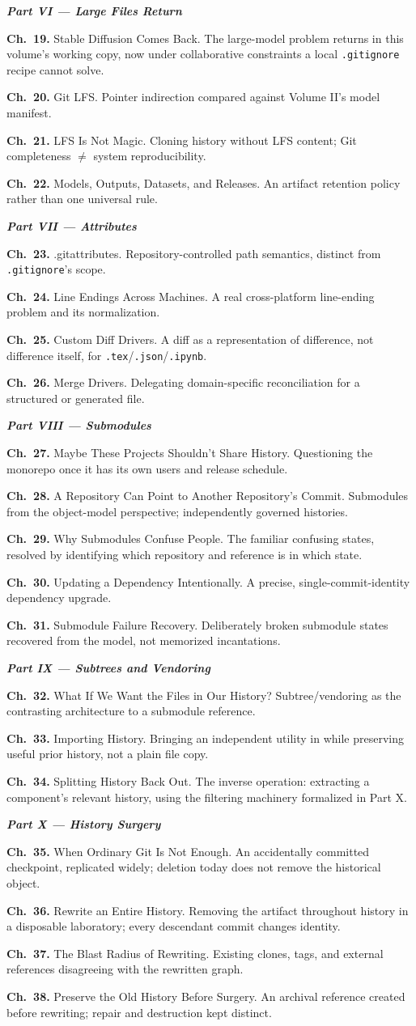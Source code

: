 \documentclass[11pt]{book}
\newcommand{\chapentry}[2]{\noindent\textbf{Ch.~#1.} #2\par\smallskip}
\newcommand{\partheading}[1]{\bigskip\noindent\textbf{\textit{#1}}\smallskip\par}
\begin{document}
\partheading{Part VI --- Large Files Return}
\chapentry{19}{Stable Diffusion Comes Back. The large-model problem returns in this volume's working copy, now under collaborative constraints a local \texttt{.gitignore} recipe cannot solve.}
\chapentry{20}{Git LFS. Pointer indirection compared against Volume II's model manifest.}
\chapentry{21}{LFS Is Not Magic. Cloning history without LFS content; Git completeness $\neq$ system reproducibility.}
\chapentry{22}{Models, Outputs, Datasets, and Releases. An artifact retention policy rather than one universal rule.}

\partheading{Part VII --- Attributes}
\chapentry{23}{.gitattributes. Repository-controlled path semantics, distinct from \texttt{.gitignore}'s scope.}
\chapentry{24}{Line Endings Across Machines. A real cross-platform line-ending problem and its normalization.}
\chapentry{25}{Custom Diff Drivers. A diff as a representation of difference, not difference itself, for \texttt{.tex}/\texttt{.json}/\texttt{.ipynb}.}
\chapentry{26}{Merge Drivers. Delegating domain-specific reconciliation for a structured or generated file.}

\partheading{Part VIII --- Submodules}
\chapentry{27}{Maybe These Projects Shouldn't Share History. Questioning the monorepo once it has its own users and release schedule.}
\chapentry{28}{A Repository Can Point to Another Repository's Commit. Submodules from the object-model perspective; independently governed histories.}
\chapentry{29}{Why Submodules Confuse People. The familiar confusing states, resolved by identifying which repository and reference is in which state.}
\chapentry{30}{Updating a Dependency Intentionally. A precise, single-commit-identity dependency upgrade.}
\chapentry{31}{Submodule Failure Recovery. Deliberately broken submodule states recovered from the model, not memorized incantations.}

\partheading{Part IX --- Subtrees and Vendoring}
\chapentry{32}{What If We Want the Files in Our History? Subtree/vendoring as the contrasting architecture to a submodule reference.}
\chapentry{33}{Importing History. Bringing an independent utility in while preserving useful prior history, not a plain file copy.}
\chapentry{34}{Splitting History Back Out. The inverse operation: extracting a component's relevant history, using the filtering machinery formalized in Part X.}

\partheading{Part X --- History Surgery}
\chapentry{35}{When Ordinary Git Is Not Enough. An accidentally committed checkpoint, replicated widely; deletion today does not remove the historical object.}
\chapentry{36}{Rewrite an Entire History. Removing the artifact throughout history in a disposable laboratory; every descendant commit changes identity.}
\chapentry{37}{The Blast Radius of Rewriting. Existing clones, tags, and external references disagreeing with the rewritten graph.}
\chapentry{38}{Preserve the Old History Before Surgery. An archival reference created before rewriting; repair and destruction kept distinct.}
\end{document}
